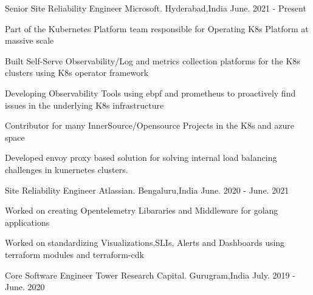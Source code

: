 

\begin{cventries}

    \cventry
    {Senior Site Reliability Engineer} %
    {Microsoft.} %
    {Hyderabad,India} %
    {June. 2021 - Present} %
    {
      \begin{cvitems} %
         \item { Part of the  Kubernetes Platform team responsible for Operating K8s Platform at massive scale }
	       \item { Built Self-Serve Observability/Log and metrics collection platforms for the K8s clusters using K8s operator framework}
	       \item { Developing Observability Tools using ebpf and prometheus to proactively find issues in the underlying K8s infrastructure}
         \item { Contributor for many InnerSource/Opensource Projects in the K8s and azure space }
         \item { Developed envoy proxy based solution for solving internal load balancing challenges in kunernetes clusters.} 		
	  \end{cvitems}
    }
    \cventry
    {Site Reliability Engineer} %
    {Atlassian.} %
    {Bengaluru,India} %
    {June. 2020 - June. 2021} %
    {
      \begin{cvitems} %
               \item { Worked on creating Opentelemetry Libararies and Middleware for golang applications }
               \item { Worked on standardizing Visualizations,SLIs, Alerts and Dashboards using terraform modules and terraform-cdk} 		
	  \end{cvitems}
    }
    \cventry
    {Core Software Engineer} %
    {Tower Research Capital.} %
    {Gurugram,India} %
    {July. 2019 - June. 2020} %
    {
      \begin{cvitems} %

\end{cvitems}}
\end{cventries}
